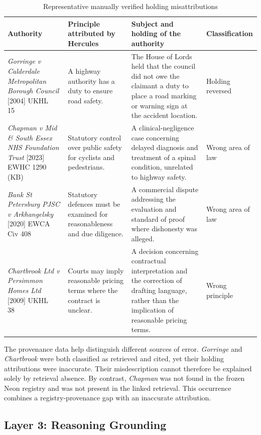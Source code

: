 \documentclass[conference]{IEEEtran}
\begin{document}
\begin{table}[t]
\centering
\small
\caption{Representative manually verified holding misattributions}
\label{tab:misattributions}
\begin{tabular}{p{3.4cm}p{3.9cm}p{5.2cm}p{2.3cm}}
\toprule
\textbf{Authority} & \textbf{Principle attributed by Hercules} & \textbf{Subject and holding of the authority} & \textbf{Classification} \\
\midrule
\textit{Gorringe v Calderdale Metropolitan Borough Council} [2004] UKHL 15~\cite{gorringe2004}
& A highway authority has a duty to ensure road safety.
& The House of Lords held that the council did not owe the claimant a duty to place a road marking or warning sign at the accident location.
& Holding reversed \\
\addlinespace
\textit{Chapman v Mid \& South Essex NHS Foundation Trust} [2023] EWHC 1290 (KB)~\cite{chapman2023}
& Statutory control over public safety for cyclists and pedestrians.
& A clinical-negligence case concerning delayed diagnosis and treatment of a spinal condition, unrelated to highway safety.
& Wrong area of law \\
\addlinespace
\textit{Bank St Petersburg PJSC v Arkhangelsky} [2020] EWCA Civ 408~\cite{bankstpetersburg2020}
& Statutory defences must be examined for reasonableness and due diligence.
& A commercial dispute addressing the evaluation and standard of proof where dishonesty was alleged.
& Wrong area of law \\
\addlinespace
\textit{Chartbrook Ltd v Persimmon Homes Ltd} [2009] UKHL 38~\cite{chartbrook2009}
& Courts may imply reasonable pricing terms where the contract is unclear.
& A decision concerning contractual interpretation and the correction of drafting language, rather than the implication of reasonable pricing terms.
& Wrong principle \\
\bottomrule
\end{tabular}
\end{table}

The provenance data help distinguish different sources of error. \textit{Gorringe} and \textit{Chartbrook} were both classified as retrieved and cited, yet their holding attributions were inaccurate. Their misdescription cannot therefore be explained solely by retrieval absence. By contrast, \textit{Chapman} was not found in the frozen Neon registry and was not present in the linked retrieval. This occurrence combines a registry-provenance gap with an inaccurate attribution.

\subsection{Layer 3: Reasoning Grounding}
\end{document}
